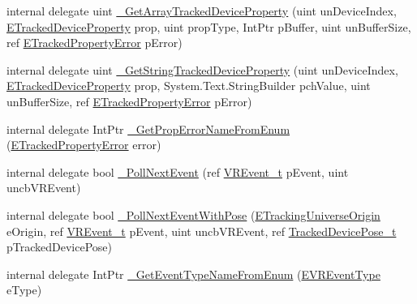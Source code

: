 \begin{DoxyCompactItemize}
\item 
internal delegate uint \mbox{\hyperlink{struct_valve_1_1_v_r_1_1_i_v_r_system_a664650bb051f15b2aa5974a22fb4f483}{\+\_\+\+Get\+Array\+Tracked\+Device\+Property}} (uint un\+Device\+Index, \mbox{\hyperlink{namespace_valve_1_1_v_r_ab060521ead7273986988fc4897e52482}{E\+Tracked\+Device\+Property}} prop, uint prop\+Type, Int\+Ptr p\+Buffer, uint un\+Buffer\+Size, ref \mbox{\hyperlink{namespace_valve_1_1_v_r_aab6684f03930a2d2cf22ed66b437e47b}{E\+Tracked\+Property\+Error}} p\+Error)
\item 
internal delegate uint \mbox{\hyperlink{struct_valve_1_1_v_r_1_1_i_v_r_system_a6dec2a7ad8cb675cbc12248da723827b}{\+\_\+\+Get\+String\+Tracked\+Device\+Property}} (uint un\+Device\+Index, \mbox{\hyperlink{namespace_valve_1_1_v_r_ab060521ead7273986988fc4897e52482}{E\+Tracked\+Device\+Property}} prop, System.\+Text.\+String\+Builder pch\+Value, uint un\+Buffer\+Size, ref \mbox{\hyperlink{namespace_valve_1_1_v_r_aab6684f03930a2d2cf22ed66b437e47b}{E\+Tracked\+Property\+Error}} p\+Error)
\item 
internal delegate Int\+Ptr \mbox{\hyperlink{struct_valve_1_1_v_r_1_1_i_v_r_system_ab8df6803ff20af23449bb3a8951f75f8}{\+\_\+\+Get\+Prop\+Error\+Name\+From\+Enum}} (\mbox{\hyperlink{namespace_valve_1_1_v_r_aab6684f03930a2d2cf22ed66b437e47b}{E\+Tracked\+Property\+Error}} error)
\item 
internal delegate bool \mbox{\hyperlink{struct_valve_1_1_v_r_1_1_i_v_r_system_ad05dee46b825b66c941f09a69ddc2a13}{\+\_\+\+Poll\+Next\+Event}} (ref \mbox{\hyperlink{struct_valve_1_1_v_r_1_1_v_r_event__t}{V\+R\+Event\+\_\+t}} p\+Event, uint uncb\+V\+R\+Event)
\item 
internal delegate bool \mbox{\hyperlink{struct_valve_1_1_v_r_1_1_i_v_r_system_a651836066c8780d5e5aadab482bd22d3}{\+\_\+\+Poll\+Next\+Event\+With\+Pose}} (\mbox{\hyperlink{namespace_valve_1_1_v_r_a29be99a3c2f780157bd490db06a7f12f}{E\+Tracking\+Universe\+Origin}} e\+Origin, ref \mbox{\hyperlink{struct_valve_1_1_v_r_1_1_v_r_event__t}{V\+R\+Event\+\_\+t}} p\+Event, uint uncb\+V\+R\+Event, ref \mbox{\hyperlink{struct_valve_1_1_v_r_1_1_tracked_device_pose__t}{Tracked\+Device\+Pose\+\_\+t}} p\+Tracked\+Device\+Pose)
\item 
internal delegate Int\+Ptr \mbox{\hyperlink{struct_valve_1_1_v_r_1_1_i_v_r_system_a31f48cf54b258ae76bcfc5444ee883c8}{\+\_\+\+Get\+Event\+Type\+Name\+From\+Enum}} (\mbox{\hyperlink{namespace_valve_1_1_v_r_afe3398b9e5cb1ea06335142d1b9289f3}{E\+V\+R\+Event\+Type}} e\+Type)
\item 

\end{DoxyCompactItemize}
